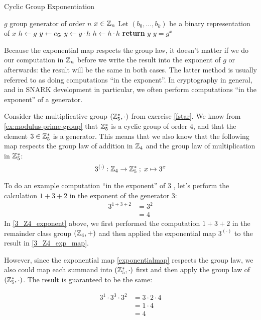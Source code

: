 \begin{algorithm}\caption{Cyclic Group Exponentiation}
\label{alg_square-and-mul}
\begin{algorithmic}[0]
\Require $g$ group generator of order $n$
\Require $x \in \mathbb{Z}_n$ 
\State Let $(b_0,\ldots,b_k)$ be a binary representation of $x$ 
\State $h \gets g$
\State $y \gets e_{\mathbb{G}}$
		\State $y\gets y\cdot h$ 
	\EndIf
	\State $h \gets h\cdot h$ 
\EndFor
\State \textbf{return} $y$
\EndProcedure
\Ensure $ y = g^x$
\end{algorithmic}
\end{algorithm}

Because the exponential map respects the group law, it doesn't matter if we do our computation in $\mathbb{Z}_n$ before we write the result into the exponent of $g$ or afterwards: the result will be the same in both cases. The latter method is usually referred to as doing computations ``in the exponent''. In cryptography in general, and in SNARK development in particular, we often perform computations ``in the exponent'' of a generator.
\begin{example}\label{ex:in-the-exponent} Consider the multiplicative group $(\mathbb{Z}_{5}^*,\cdot)$ from exercise \ref{fstar}. We know from \ref{ex:modulus-prime-group} that $\mathbb{Z}_{5}^*$ is a cyclic group of order $4$, and that the element $3\in\mathbb{Z}_5^*$ is a generator. This means that we also know that the following map respects the group law of addition in $\mathbb{Z}_4$ and the group law of multiplication in $\mathbb{Z}_5^*$:
$$
3^{(\cdot)}: \mathbb{Z}_4 \to \mathbb{Z}_5^* \;;\; x \mapsto 3^x
$$

To do an example computation ``in the exponent'' of $3$ , let's perform the calculation  $1+3+2$ in the exponent of the generator $3$:
\begin{align}
3^{1+3+2} &=3^{2}\label{3_Z4_exponent}\\
          & = 4\label{3_Z4_exp_map}
\end{align}
In \eqref{3_Z4_exponent} above, we first performed the computation $1+3+2$ in the remainder class group $(\mathbb{Z}_4,+)$ and then applied the exponential map $3^{(\cdot)}$ to the result in \eqref{3_Z4_exp_map}. 

However, since the exponential map \eqref{exponentialmap} respects the group law, we also could map each summand into $(\mathbb{Z}_5^*,\cdot)$ first and then apply the group law of $(\mathbb{Z}_5^*,\cdot)$. The result is guaranteed to be the same:

\begin{align*}
3^1 \cdot 3^3 \cdot 3^{2}
          & = 3\cdot 2 \cdot 4\\
          & = 1\cdot 4\\
          & = 4
\end{align*}
\end{example}
